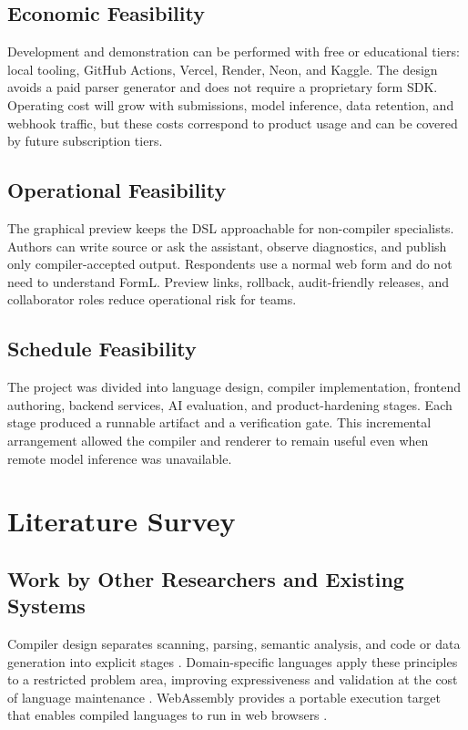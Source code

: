 \documentclass[12pt,a4paper,oneside]{report}
\begin{document}
\section{Economic Feasibility}
Development and demonstration can be performed with free or educational tiers: local tooling,
GitHub Actions, Vercel, Render, Neon, and Kaggle. The design avoids a paid parser generator and
does not require a proprietary form SDK. Operating cost will grow with submissions, model
inference, data retention, and webhook traffic, but these costs correspond to product usage and
can be covered by future subscription tiers.

\section{Operational Feasibility}
The graphical preview keeps the DSL approachable for non-compiler specialists. Authors can
write source or ask the assistant, observe diagnostics, and publish only compiler-accepted
output. Respondents use a normal web form and do not need to understand FormL. Preview links,
rollback, audit-friendly releases, and collaborator roles reduce operational risk for teams.

\section{Schedule Feasibility}
The project was divided into language design, compiler implementation, frontend authoring,
backend services, AI evaluation, and product-hardening stages. Each stage produced a runnable
artifact and a verification gate. This incremental arrangement allowed the compiler and
renderer to remain useful even when remote model inference was unavailable.

\chapter{Literature Survey}

\section{Work by Other Researchers and Existing Systems}
Compiler design separates scanning, parsing, semantic analysis, and code or data generation
into explicit stages \citep{craftinginterpreters,dragonbook}. Domain-specific languages apply
these principles to a restricted problem area, improving expressiveness and validation at the
cost of language maintenance \citep{fowlerdsl}. WebAssembly provides a portable execution
target that enables compiled languages to run in web browsers \citep{webassembly}.
\end{document}
